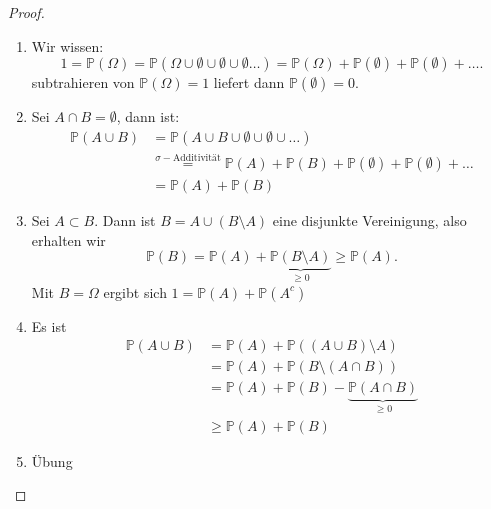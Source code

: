 \begin{proof}
    \begin{enumerate}[label=\protect\circled{\alph*}]
        \item Wir wissen:
            \[
                1= \mathbb{P}(\Omega) = \mathbb{P}\left( \Omega \cup \emptyset \cup \emptyset \cup \emptyset \ldots  \right)  = \mathbb{P}(\Omega) + \mathbb{P}(\emptyset) + \mathbb{P}(\emptyset) + \ldots
            .\] 
            subtrahieren von $\mathbb{P}(\Omega) =1$ liefert dann $\mathbb{P}(\emptyset) = 0$.
        \item Sei $A \cap B = \emptyset$, dann ist:
            \begin{equation}
                \begin{split}
                    \mathbb{P}(A\cup B ) &= \mathbb{P}(A \cup B \cup \emptyset \cup \emptyset \cup \ldots) \\
                                         &\stackrel{σ-\text{Additivität}}{=} \mathbb{P}(A) + \mathbb{P}(B) + \mathbb{P}(\emptyset) + \mathbb{P}(\emptyset) + \ldots \\
                                         &= \mathbb{P}(A) + \mathbb{P}(B)
                \end{split}
            \end{equation}
        \item Sei $A\subset B$. Dann ist $B = A \cup (B \setminus A)$ eine disjunkte Vereinigung, also erhalten wir
            \[
                \mathbb{P}(B) = \mathbb{P}(A) + \underbrace{\mathbb{P}(B \setminus A)}_{\geq 0} \geq  \mathbb{P}(A)
            .\] 
            Mit $B = \Omega$ ergibt sich  $1 = \mathbb{P}(A) + \mathbb{P}(A^{c})$
        \item Es ist
            \begin{equation}
                \begin{split}
                    \mathbb{P}(A \cup B) &= \mathbb{P}(A) + \mathbb{P}((A \cup B) \setminus A)  \\
                                         &= \mathbb{P}(A) + \mathbb{P}(B \setminus (A \cap B)) \\
                                         &= \mathbb{P}(A) + \mathbb{P}(B) - \underbrace{\mathbb{P}(A \cap B)}_{\geq 0} \\
                                         &\geq \mathbb{P}(A) + \mathbb{P}(B)
                \end{split}
            \end{equation}
        \item Übung
    \end{enumerate}
\end{proof}
